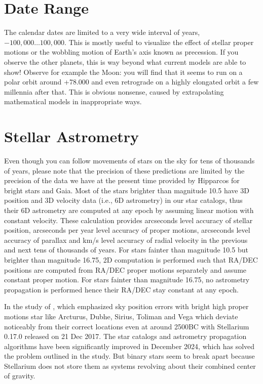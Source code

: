 \section{Date Range}
\label{sec:Accuracy:DateRange}

The calendar dates are limited to a very wide interval of years, $-100,000\ldots100,000$. 
This is mostly useful to visualize the effect of stellar proper motions or the wobbling 
motion of Earth's axis known as precession. 
If you observe the other planets, this is way beyond what current models are able to show! 
Observe for example the Moon: you will find that it seems to run 
on a polar orbit around +78.000 and even retrograde on a highly elongated orbit a few millennia after that. 
This is obvious nonsense, caused by extrapolating mathematical models in inappropriate ways. 

\section{Stellar Astrometry}
\label{sec:Accuracy:Astrometry}

Even though you can follow movements of stars on the sky for tens of thousands of years, 
please note that the precision of these predictions are limited by the precision of the data we have at 
the present time provided by Hipparcos for bright stars and Gaia. Most of the stars brighter than magnitude 10.5 
have 3D position and 3D velocity data (i.e., 6D astrometry) in our star catalogs, thus their 6D astrometry are computed 
at any epoch by assuming linear motion with constant velocity. These calculation provides arcseconds level accuracy
of stellar position, arcseconds per year level accuracy of proper motions, arcseconds level accuracy of parallax and km/s 
level accuracy of radial velocity in the previous and next tens of thousands of years. For stars fainter than magnitude 10.5 but brighter
than magnitude 16.75, 2D computation is performed such that RA/DEC positions are computed from RA/DEC proper motions separately and assume
constant proper motion. For stars fainter than magnitude 16.75, no astrometry propagation is performed hence their RA/DEC stay constant at any epoch.

In the study of \citep{deLorenzis:2018}, which emphasized sky position errors with bright high proper motions star like Arcturus, 
Dubhe, Sirius, Toliman and Vega which deviate noticeably from their correct locations even at around 2500BC with Stellarium 
0.17.0 released on 21 Dec 2017. The star catalogs and astrometry propagation algorithms have been significantly improved in 
December 2024, which has solved the problem outlined in the study. But binary stars seem to break apart because Stellarium does 
not store them as systems revolving about their combined center of gravity.

